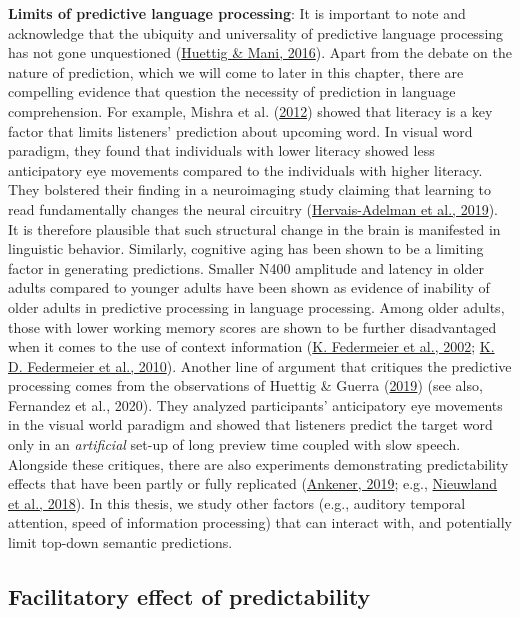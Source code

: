 \documentclass[a4paper, nobind]{templates/ociamthesis}
\begin{document}
\textbf{Limits of predictive language processing}:
It is important to note and acknowledge that the ubiquity and universality of predictive language processing has not gone unquestioned (\protect\hyperlink{ref-Huettig2016}{Huettig \& Mani, 2016}).
Apart from the debate on the nature of prediction, which we will come to later in this chapter, there are compelling evidence that question the necessity of prediction in language comprehension.
For example, Mishra et al. (\protect\hyperlink{ref-Mishra2012}{2012}) showed that literacy is a key factor that limits listeners' prediction about upcoming word.
In visual word paradigm, they found that individuals with lower literacy showed less anticipatory eye movements compared to the individuals with higher literacy.
They bolstered their finding in a neuroimaging study claiming that learning to read fundamentally changes the neural circuitry (\protect\hyperlink{ref-Hervais2019}{Hervais-Adelman et al., 2019}).
It is therefore plausible that such structural change in the brain is manifested in linguistic behavior.
Similarly, cognitive aging has been shown to be a limiting factor in generating predictions.
Smaller N400 amplitude and latency in older adults compared to younger adults have been shown as evidence of inability of older adults in predictive processing in language processing.
Among older adults, those with lower working memory scores are shown to be further disadvantaged when it comes to the use of context information (\protect\hyperlink{ref-Federmeier2002}{K. Federmeier et al., 2002}; \protect\hyperlink{ref-Federmeier2010}{K. D. Federmeier et al., 2010}).
Another line of argument that critiques the predictive processing comes from the observations of Huettig \& Guerra (\protect\hyperlink{ref-Huettig2019}{2019}) (see also, Fernandez et al., 2020).
They analyzed participants' anticipatory eye movements in the visual world paradigm and showed that listeners predict the target word only in an \emph{artificial} set-up of long preview time coupled with slow speech.
Alongside these critiques, there are also experiments demonstrating predictability effects that have been partly or fully replicated (\protect\hyperlink{ref-Ankener2019}{Ankener, 2019}; e.g., \protect\hyperlink{ref-Nieuwland2018}{Nieuwland et al., 2018}).
In this thesis, we study other factors (e.g., auditory temporal attention, speed of information processing) that can interact with, and potentially limit top-down semantic predictions.

\hypertarget{background-facilitatory-effect}{%
\subsection{Facilitatory effect of predictability}\label{background-facilitatory-effect}}
\end{document}
